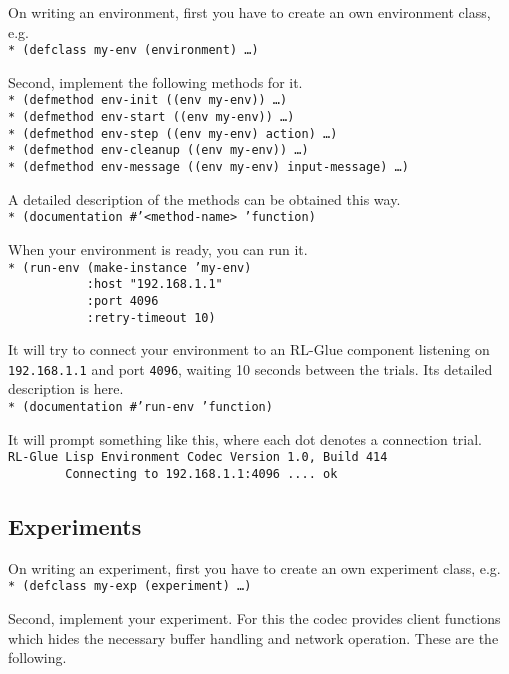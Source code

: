 \documentclass[11pt,a4paper,dvipdfm]{article}
\newcommand{\prompttext}[1]{\texttt{#1}}
\newcommand{\lispprompt}[1]{\prompttext{* #1}}
\begin{document}
On writing an environment, first you have to create an own environment class,
e.g. \\
\lispprompt{(defclass my-env (environment) \ldots)}

Second, implement the following methods for it. \\
\lispprompt{(defmethod env-init ((env my-env)) \ldots)} \\
\lispprompt{(defmethod env-start ((env my-env)) \ldots)} \\
\lispprompt{(defmethod env-step ((env my-env) action) \ldots)} \\
\lispprompt{(defmethod env-cleanup ((env my-env)) \ldots)} \\
\lispprompt{(defmethod env-message ((env my-env) input-message) \ldots)}

A detailed description of the methods can be obtained this way. \\
\lispprompt{(documentation \#'<method-name> 'function)}

When your environment is ready, you can run it. \\
\lispprompt{(run-env (make-instance 'my-env) \\
\mbox{~~~~~~~~~~~}:host "192.168.1.1" \\
\mbox{~~~~~~~~~~~}:port 4096 \\
\mbox{~~~~~~~~~~~}:retry-timeout 10)}

It will try to connect your environment to an RL-Glue component listening on
\prompttext{192.168.1.1} and port \prompttext{4096}, waiting 10 seconds
between the trials. Its detailed description is here. \\
\lispprompt{(documentation \#'run-env 'function)}

It will prompt something like this, where each dot denotes a connection
trial. \\
\prompttext{RL-Glue Lisp Environment Codec Version 1.0, Build 414} \\
\prompttext{\mbox{~~~~~~~~}Connecting to 192.168.1.1:4096 ....~ok}

\subsection{Experiments}

On writing an experiment, first you have to create an own experiment class,
e.g. \\
\lispprompt{(defclass my-exp (experiment) \ldots)}

Second, implement your experiment. For this the codec provides client
functions which hides the necessary buffer handling and network operation.
These are the following.
\end{document}
